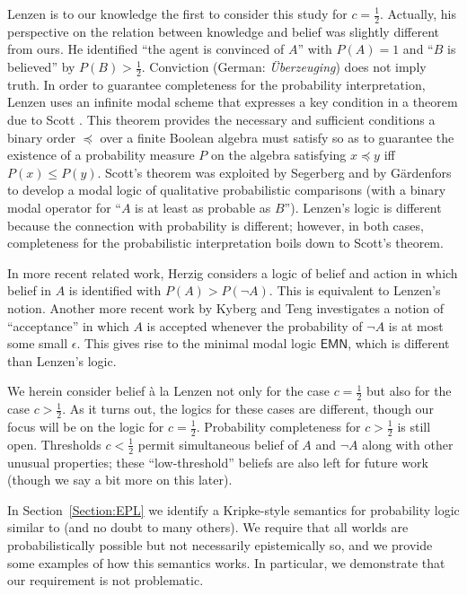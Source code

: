 \documentclass[12pt]{article}
\theoremstyle{definition}
\begin{document}
Lenzen \cite{Lenzen2003:kbasp,Lenzen1980:gwuw} is to our knowledge the
first to consider this study for $c=\frac 12$. Actually, his
perspective on the relation between knowledge and belief was slightly
different from ours.  He identified ``the agent is convinced of $A$''
with $P(A)=1$ and ``$B$ is believed'' by $P(B)>\frac 12$. Conviction
(German: \emph{\"{U}berzeuging}) does not imply truth.  In order to
guarantee completeness for the probability interpretation, Lenzen uses
an infinite modal scheme that expresses a key condition in a theorem
due to Scott \cite{Sco64:JMP}.  This theorem provides the necessary
and sufficient conditions a binary order $\preceq$ over a finite
Boolean algebra must satisfy so as to guarantee the existence of a
probability measure $P$ on the algebra satisfying $x\preceq y$ iff
$P(x)\leq P(y)$.  Scott's theorem was exploited by Segerberg
\cite{Segerberg1971:qpiams} and by G{\"a}rdenfors \cite{Gardenfors75}
to develop a modal logic of qualitative probabilistic comparisons
(with a binary modal operator for ``$A$ is at least as probable as
$B$'').  Lenzen's logic is different because the connection with
probability is different; however, in both cases, completeness for the
probabilistic interpretation boils down to Scott's theorem.

In more recent related work, Herzig \cite{Herzig2003:mpbaa} considers
a logic of belief and action in which belief in $A$ is identified with
$P(A)>P(\lnot A)$. This is equivalent to Lenzen's notion.  Another
more recent work by Kyberg and Teng \cite{KyburgTeng2012:tlorkr}
investigates a notion of ``acceptance'' in which $A$ is accepted
whenever the probability of $\lnot A$ is at most some small
$\epsilon$.  This gives rise to the minimal modal logic
$\mathsf{EMN}$, which is different than Lenzen's logic.

We herein consider belief \`{a} la Lenzen not only for the case
$c=\frac 12$ but also for the case $c>\frac 12$.  As it turns out, the
logics for these cases are different, though our focus will be on the
logic for $c=\frac 12$.  Probability completeness for $c>\frac 12$ is
still open.  Thresholds $c<\frac 12$ permit simultaneous belief of $A$
and $\lnot A$ along with other unusual properties; these
``low-threshold'' beliefs are also left for future work (though we say
a bit more on this later).

In Section~\ref{Section:EPL} we identify a Kripke-style semantics for
probability logic similar to
\cite{EijckSchwarzentruber2014:epls,Halpern2003:rau} (and no doubt to
many others).  We require that all worlds are probabilistically
possible but not necessarily epistemically so, and we provide some
examples of how this semantics works.  In particular, we demonstrate
that our requirement is not problematic.
\end{document}
